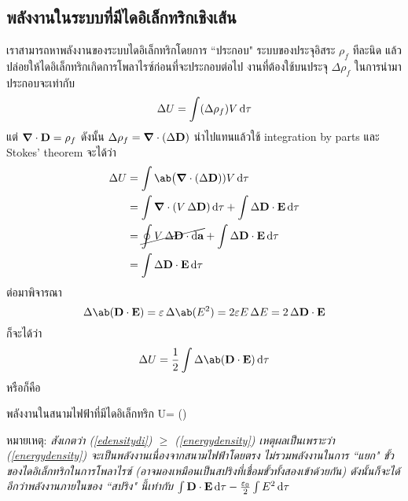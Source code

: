 \subsection{พลังงานในระบบที่มีไดอิเล็กทริกเชิงเส้น}
เราสามารถหาพลังงานของระบบไดอิเล็กทริกโดยการ ``ประกอบ" ระบบของประจุอิสระ $\rho_f$ ทีละนิด แล้วปล่อยให้ไดอิเล็กทริกเกิดการโพลาไรซ์ก่อนที่จะประกอบต่อไป งานที่ต้องใช้บนประจุ $\Delta \rho_f$ ในการนำมาประกอบจะเท่ากับ
\[
\Delta U=\int(\Delta\rho_f)V\odif{\tau}
\]
แต่ $\boldsymbol{\nabla}\cdot\mathbf{D}=\rho_f$ ดังนั้น $\Delta\rho_f=\boldsymbol{\nabla}\cdot(\Delta\mathbf{D})$ นำไปแทนแล้วใช้ integration by parts และ Stokes' theorem จะได้ว่า
\begin{align*}
    \Delta U&=\int\ab\big(\gd\cdot(\Delta\vb{D}))V\odif{\tau}\\
    &=\int\gd\cdot(V\,\Delta\vb{D})\odif{\tau}+\int\Delta\vb{D}\cdot\vb{E}\odif{\tau}\\
    &=\cancel{\oint V\,\Delta\vb{D}\cdot\odif{\vb{a}}}+\int\Delta\vb{D}\cdot\vb{E}\odif{\tau}\\
    &=\int\Delta\vb{D}\cdot\vb{E}\odif{\tau}
\end{align*}
ต่อมาพิจารณา
\[
\Delta\ab(\vb{D}\cdot\vb{E})=\eps\,\Delta\ab(E^2)=2\eps E\,\Delta E=2\,\Delta\vb{D}\cdot\vb{E}
\]
ก็จะได้ว่า
\[
\Delta U=\frac{1}{2}\int\Delta\ab(\vb{D}\cdot\vb{E})\odif{\tau}
\]
หรือก็คือ
\begin{ieqbox}{พลังงานในสนามไฟฟ้าที่มีไดอิเล็กทริก}
    U= \int \ab(\cdot{})\odif{\tau}\label{edensitydi}
\end{ieqbox}
หมายเหตุ: \emph{สังเกตว่า (\ref{edensitydi}) $\geq$ (\ref{energydensity}) เหตุผลเป็นเพราะว่า (\ref{energydensity}) จะเป็นพลังงานเนื่องจากสนามไฟฟ้าโดยตรง ไม่รวมพลังงานในการ ``แยก" ขั้วของไดอิเล็กทริกในการโพลาไรซ์ (อาจมองเหมือนเป็นสปริงที่เชื่อมขั้วทั้งสองเข้าด้วยกัน) ดังนั้นก็จะได้อีกว่าพลังงานภายในของ ``สปริง" นี้เท่ากับ $\int \vb{D}\cdot\vb{E}\odif{\tau} - \frac{\eps_0}{2}\int E^2\odif{\tau}$} 
